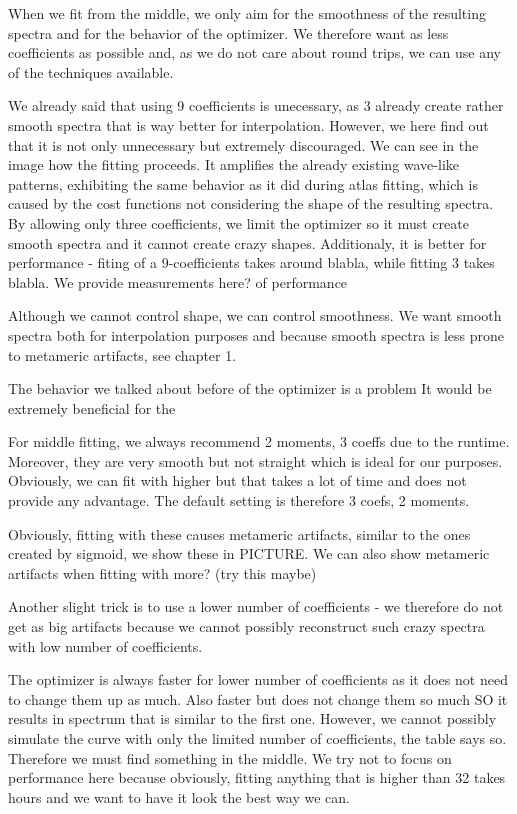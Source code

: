 When we fit from the middle, we only aim for the smoothness of the resulting spectra and for the behavior of the optimizer. We therefore want as less coefficients as possible and, as we do not care about round trips, we can use any of the techniques available.

We already said that using 9 coefficients is unecessary, as 3 already create rather smooth spectra that is way better for interpolation. However, we here find out that it is not only unnecessary but extremely discouraged. We can see in the image how the fitting proceeds. It amplifies the already existing wave-like patterns, exhibiting the same behavior as it did during atlas fitting, which is caused by the cost functions not considering the shape of the resulting spectra. By allowing only three coefficients, we limit the optimizer so it must create smooth spectra and it cannot create crazy shapes. Additionaly, it is better for performance - fiting of a 9-coefficients takes around blabla, while fitting 3 takes blabla. We provide measurements here? of performance

Although we cannot control shape, we can control smoothness. We want smooth spectra both for interpolation purposes and because smooth spectra is less prone to metameric artifacts, see chapter 1.

The behavior we talked about before of the optimizer is a problem 
It would be extremely beneficial for the

For middle fitting, we always recommend 2 moments, 3 coeffs due to the runtime. Moreover, they are very smooth but not straight which is ideal for our purposes. Obviously, we can fit with higher but that takes a lot of time and does not provide any advantage. The default setting is therefore 3 coefs, 2 moments.

Obviously, fitting with these causes metameric artifacts, similar to the ones created by sigmoid, we show these in PICTURE. We can also show metameric artifacts when fitting with more? (try this maybe)

Another slight trick is to use a lower number of coefficients - we therefore do not get as big artifacts because we cannot possibly reconstruct such crazy spectra with low number of coefficients. 

The optimizer is always faster for lower number of coefficients as it does not need to change them up as much. Also faster but does not change them so much SO it results in spectrum that is similar to the first one. However, we cannot possibly simulate the curve with only the limited number of coefficients, the table says so. Therefore we must find something in the middle. We try not to focus on performance here because obviously, fitting anything that is higher than 32 takes hours and we want to have it look the best way we can.

